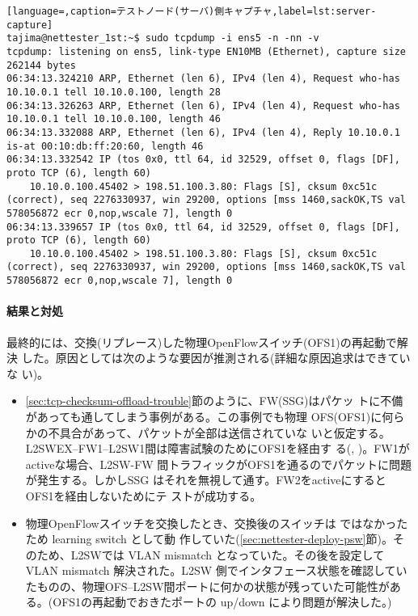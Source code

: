 \begin{lstlisting}[language=,caption=テストノード(サーバ)側キャプチャ,label=lst:server-capture]
tajima@nettester_1st:~$ sudo tcpdump -i ens5 -n -nn -v
tcpdump: listening on ens5, link-type EN10MB (Ethernet), capture size 262144 bytes
06:34:13.324210 ARP, Ethernet (len 6), IPv4 (len 4), Request who-has 10.10.0.1 tell 10.10.0.100, length 28
06:34:13.326263 ARP, Ethernet (len 6), IPv4 (len 4), Request who-has 10.10.0.1 tell 10.10.0.100, length 46
06:34:13.332088 ARP, Ethernet (len 6), IPv4 (len 4), Reply 10.10.0.1 is-at 00:10:db:ff:20:60, length 46
06:34:13.332542 IP (tos 0x0, ttl 64, id 32529, offset 0, flags [DF], proto TCP (6), length 60)
    10.10.0.100.45402 > 198.51.100.3.80: Flags [S], cksum 0xc51c (correct), seq 2276330937, win 29200, options [mss 1460,sackOK,TS val 578056872 ecr 0,nop,wscale 7], length 0
06:34:13.339657 IP (tos 0x0, ttl 64, id 32529, offset 0, flags [DF], proto TCP (6), length 60)
    10.10.0.100.45402 > 198.51.100.3.80: Flags [S], cksum 0xc51c (correct), seq 2276330937, win 29200, options [mss 1460,sackOK,TS val 578056872 ecr 0,nop,wscale 7], length 0
\end{lstlisting}

    \paragraph{結果と対処}

最終的には、交換(リプレース)した物理OpenFlowスイッチ(OFS1)の再起動で解決
した。原因としては次のような要因が推測される(詳細な原因追求はできていな
い)。
\begin{itemize}
 \item \ref{sec:tcp-checksum-offload-trouble}節のように、FW(SSG)はパケッ
       トに不備があっても通してしまう事例がある。この事例でも物理
       OFS(OFS1)に何らかの不具合があって、パケットが全部は送信されていな
       いと仮定する。L2SWEX--FW1--L2SW1間は障害試験のためにOFS1を経由す
       る(,
       )。FW1がactiveな場合、L2SW-FW
       間トラフィックがOFS1を通るのでパケットに問題が発生する。しかしSSG
       はそれを無視して通す。FW2をactiveにするとOFS1を経由しないためにテ
       ストが成功する。
 \item 物理OpenFlowスイッチを交換したとき、交換後のスイッチは
       ではなかったため learning switch として動
       作していた(\ref{sec:nettester-deploy-psw}節)。そのため、L2SWでは
       VLAN mismatch となっていた。その後を設定して
       VLAN mismatch 解決された。L2SW 側でインタフェース状態を確認してい
       たものの、物理OFS--L2SW間ポートに何かの状態が残っていた可能性があ
       る。(OFS1の再起動でおきたポートの up/down により問題が解決した。)
\end{itemize}

